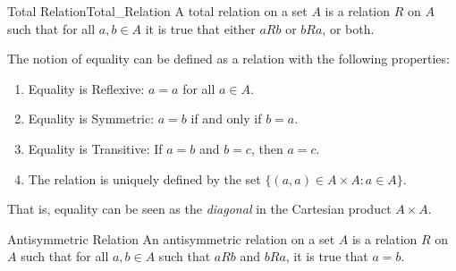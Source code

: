     \begin{fdefinition}{Total Relation}{Total_Relation}
        A total relation on a set $A$ is a relation $R$ on $A$ such
        that for all $a,b\in{A}$ it is true that either
        $aRb$ or $bRa$, or both.
    \end{fdefinition}
    The notion of equality can be defined as a relation
    with the following properties:
    \begin{enumerate}
        \item Equality is Reflexive: $a=a$ for all $a\in{A}$.
        \item Equality is Symmetric: $a=b$ if and only if $b=a$.
        \item Equality is Transitive: If $a=b$ and $b=c$, then $a=c$.
        \item The relation is uniquely defined by the set
              $\{(a,a)\in A\times A:a\in A\}$.
    \end{enumerate}
    That is, equality can be seen as the \textit{diagonal} in the
    Cartesian product $A\times{A}$.
    \begin{fdefinition}{Antisymmetric Relation}
        An antisymmetric relation on a set $A$ is a relation $R$ on $A$
        such that for all $a,b\in{A}$ such that $aRb$ and $bRa$, it
        is true that $a=b$.
    \end{fdefinition}